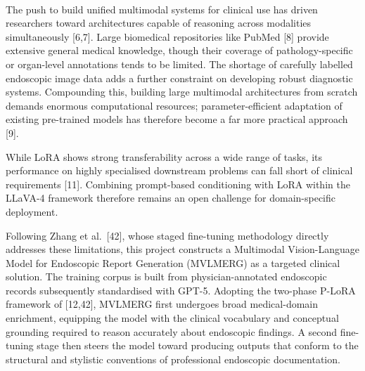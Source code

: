 ﻿﻿\documentclass[12pt]{report}
\begin{document}
The push to build unified multimodal systems for clinical use has driven researchers toward architectures capable of reasoning across modalities simultaneously [6,7]. Large biomedical repositories like PubMed [8] provide extensive general medical knowledge, though their coverage of pathology-specific or organ-level annotations tends to be limited. The shortage of carefully labelled endoscopic image data adds a further constraint on developing robust diagnostic systems. Compounding this, building large multimodal architectures from scratch demands enormous computational resources; parameter-efficient adaptation of existing pre-trained models has therefore become a far more practical approach [9].

While LoRA shows strong transferability across a wide range of tasks, its performance on highly specialised downstream problems can fall short of clinical requirements [11]. Combining prompt-based conditioning with LoRA within the LLaVA-4 framework therefore remains an open challenge for domain-specific deployment.

Following Zhang et al.\ [42], whose staged fine-tuning methodology directly addresses these limitations, this project constructs a Multimodal Vision-Language Model for Endoscopic Report Generation (MVLMERG) as a targeted clinical solution. The training corpus is built from physician-annotated endoscopic records subsequently standardised with GPT-5. Adopting the two-phase P-LoRA framework of [12,42], MVLMERG first undergoes broad medical-domain enrichment, equipping the model with the clinical vocabulary and conceptual grounding required to reason accurately about endoscopic findings. A second fine-tuning stage then steers the model toward producing outputs that conform to the structural and stylistic conventions of professional endoscopic documentation.
\end{document}
